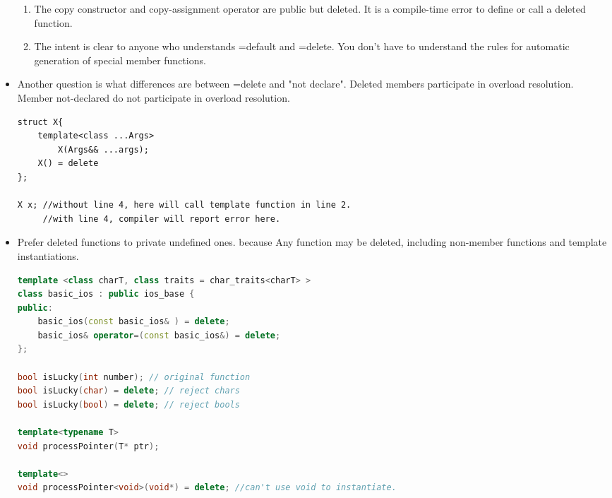 \documentclass[a4paper,11pt,twoside]{book}
\begin{document}
\begin{itemize}
\begin{enumerate}
	\item The copy constructor and copy-assignment operator are public but deleted. It is a compile-time error to define or call a deleted function.

	\item The intent is clear to anyone who understands =default and =delete. You don't have to understand the rules for automatic generation of special member functions.
\end{enumerate}

	\item Another question is what differences are between =delete and "not declare". Deleted members participate in overload resolution. Member not-declared do not participate in overload resolution.	
\begin{lstlisting}
struct X{
	template<class ...Args>
		X(Args&& ...args);
	X() = delete
};

X x; //without line 4, here will call template function in line 2.
     //with line 4, compiler will report error here.
\end{lstlisting}

    \item Prefer deleted functions to private undefined ones. because Any function may be deleted, including non-member functions and template instantiations.

\begin{lstlisting}[frame=single, language=c++]
template <class charT, class traits = char_traits<charT> >
class basic_ios : public ios_base {
public:
	basic_ios(const basic_ios& ) = delete;
	basic_ios& operator=(const basic_ios&) = delete;
};

bool isLucky(int number); // original function
bool isLucky(char) = delete; // reject chars
bool isLucky(bool) = delete; // reject bools

template<typename T>
void processPointer(T* ptr);

template<>
void processPointer<void>(void*) = delete; //can't use void to instantiate.
\end{lstlisting} 

    

\end{itemize}
\end{document}

